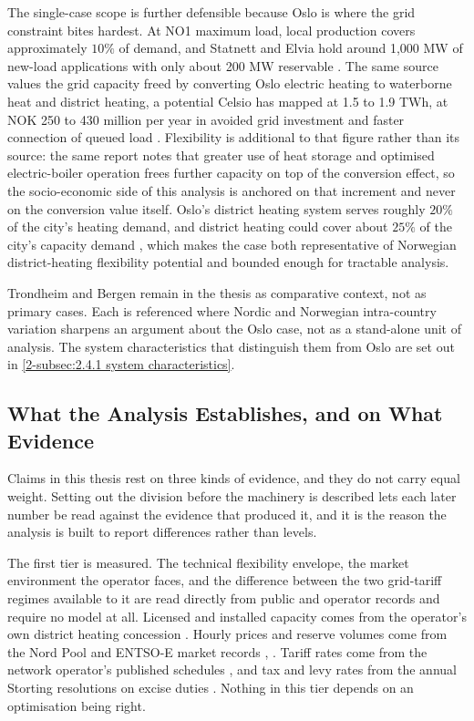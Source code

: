 The single-case scope is further defensible because Oslo is where the grid constraint bites hardest. At NO1 maximum load, local production covers approximately $10\%$ of demand, and Statnett and Elvia hold around 1,000 MW of new-load applications with only about 200 MW reservable \cite{Thema_fjernvarme_2024}. The same source values the grid capacity freed by converting Oslo electric heating to waterborne heat and district heating, a potential Celsio has mapped at 1.5 to 1.9 TWh, at NOK 250 to 430 million per year in avoided grid investment and faster connection of queued load \cite{Thema_fjernvarme_2024}. Flexibility is additional to that figure rather than its source: the same report notes that greater use of heat storage and optimised electric-boiler operation frees further capacity on top of the conversion effect, so the socio-economic side of this analysis is anchored on that increment and never on the conversion value itself. Oslo's district heating system serves roughly $20\%$ of the city's heating demand, and district heating could cover about $25\%$ of the city's capacity demand \cite{energikommisjonen_mer_2023}, which makes the case both representative of Norwegian district-heating flexibility potential and bounded enough for tractable analysis.

Trondheim and Bergen remain in the thesis as comparative context, not as primary cases. Each is referenced where Nordic and Norwegian intra-country variation sharpens an argument about the Oslo case, not as a stand-alone unit of analysis. The system characteristics that distinguish them from Oslo are set out in \autoref{2-subsec:2.4.1 system characteristics}.

\subsection{What the Analysis Establishes, and on What Evidence}
\label{3-subsec:3.2 evidence base}
\label{3-subsec:3.2 interviews}

Claims in this thesis rest on three kinds of evidence, and they do not carry equal weight. Setting out the division before the machinery is described lets each later number be read against the evidence that produced it, and it is the reason the analysis is built to report differences rather than levels.

The first tier is measured. The technical flexibility envelope, the market environment the operator faces, and the difference between the two grid-tariff regimes available to it are read directly from public and operator records and require no model at all. Licensed and installed capacity comes from the operator's own district heating concession \cite{nve_konsesjonssak_2026}. Hourly prices and reserve volumes come from the Nord Pool and ENTSO-E market records \cite{nord_pool_nord_nodate}, \cite{entsoe_entsoe_nodate}. Tariff rates come from the network operator's published schedules \cite{elvia_dagens_2022}, and tax and levy rates from the annual Storting resolutions on excise duties \cite{stortinget_stortingsvedtak_nodate}. Nothing in this tier depends on an optimisation being right.

